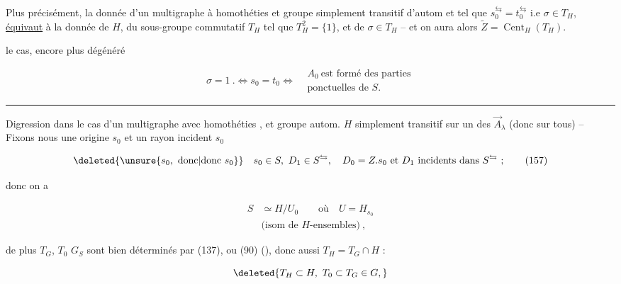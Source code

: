 
 Plus précisément, la donnée d'un multigraphe à homothéties et groupe simplement transitif d'autom   et tel que $s_0^{\leftrightarrows}=t_0^{\leftrightarrows}$ i.e $\sigma\in T_H$, \uline{équivaut} à la donnée de $H$, du sous-groupe commutatif $T_H$ tel que $T_H^2=\{1\}$, et de $\sigma\in T_H$ -- et on aura alors $\widetilde Z=\operatorname{Cent}_H(T_H)$.

 le cas, encore plus dégénéré

\[
\sigma=1\ .\Longleftrightarrow s_0=t_0\Longleftrightarrow
\begin{aligned}& A_0\ \text{est formé des parties}\\[-2pt]&\text{ponctuelles de }S.\end{aligned}\tag*{(156)}
\]

\begin{center}\rule{2.1cm}{0.3pt}\end{center}

 Digression dans le cas d'un multigraphe avec  homothéties , et groupe autom. $H$ simplement transitif sur  un des $\overrightarrow A_\lambda$ (donc sur tous) -- Fixons nous une origine $s_0$ et un rayon incident  $s_0$

\[
\deleted{\unsure{s_0,\ \text{donc}|\text{donc }s_0}}\quad s_0\in S,\ D_1\in S^{\leftrightarrows},\quad D_0=Z.s_0\ \text{et }D_1\ \text{incidents dans }S^{\leftrightarrows}\ ;\tag*{(157)}
\]

donc on a

\[
\begin{aligned}
S&\simeq H/U_0\qquad\text{où}\quad U=H_{s_0}\\
&\text{(isom de }H\text{-ensembles)}\ ,
\end{aligned}\tag*{(158)}
\]

 de plus $T_G$, $T_0$  $G_S$ sont bien déterminés par (137),  ou (90) (), donc aussi $T_H=T_G\cap H$ :

\[
\deleted{T_H\subset H,\ T_0\subset T_G\in G,}
\]

